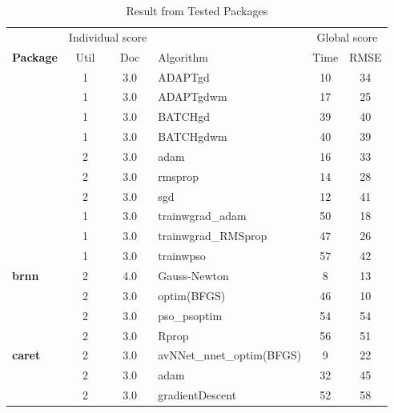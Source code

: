 \begin{Schunk}
\begin{table}

\caption{\label{tab:unnamed-chunk-2}Result from Tested Packages}
\centering
\fontsize{7}{9}\selectfont
\begin{tabular}[t]{>{\bfseries}lcclcc}
\toprule
\multicolumn{1}{c}{ } & \multicolumn{2}{c}{Individual score} & \multicolumn{1}{c}{ } & \multicolumn{2}{c}{Global score} \\
\cmidrule(l{3pt}r{3pt}){2-3} \cmidrule(l{3pt}r{3pt}){5-6}
Package & Util & Doc & Algorithm & Time & RMSE\\
\midrule
 & 1 & 3.0 & ADAPTgd & 10 & 34\\

 & 1 & 3.0 & ADAPTgdwm & 17 & 25\\

 & 1 & 3.0 & BATCHgd & 39 & 40\\

\multirow{-4}{*}{\raggedright\arraybackslash AMORE} & 1 & 3.0 & BATCHgdwm & 40 & 39\\
\cmidrule{1-6}
 & 2 & 3.0 & adam & 16 & 33\\

 & 2 & 3.0 & rmsprop & 14 & 28\\

\multirow{-3}{*}{\raggedright\arraybackslash ANN2} & 2 & 3.0 & sgd & 12 & 41\\
\cmidrule{1-6}
 & 1 & 3.0 & trainwgrad\_adam & 50 & 18\\

 & 1 & 3.0 & trainwgrad\_RMSprop & 47 & 26\\

\multirow{-3}{*}{\raggedright\arraybackslash automl} & 1 & 3.0 & trainwpso & 57 & 42\\
\cmidrule{1-6}
brnn & 2 & 4.0 & Gauss-Newton & 8 & 13\\
\cmidrule{1-6}
 & 2 & 3.0 & optim(BFGS) & 46 & 10\\

 & 2 & 3.0 & pso\_psoptim & 54 & 54\\

\multirow{-3}{*}{\raggedright\arraybackslash CaDENCE} & 2 & 3.0 & Rprop & 56 & 51\\
\cmidrule{1-6}
caret & 2 & 3.0 & avNNet\_nnet\_optim(BFGS) & 9 & 22\\
\cmidrule{1-6}
 & 2 & 3.0 & adam & 32 & 45\\

 & 2 & 3.0 & gradientDescent & 52 & 58\\


\end{tabular}
\end{table}
\end{Schunk}
